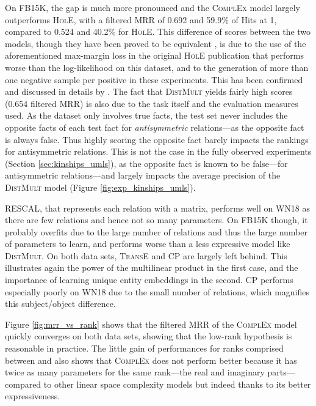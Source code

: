 \documentclass[twoside,11pt]{article}
\renewcommand{\cite}{\citep}
\begin{document}
On FB15K, the gap is much more pronounced and the \textsc{ComplEx} model largely outperforms \textsc{HolE}, with a filtered MRR of 0.692 and 59.9\% of Hits at 1, compared to 0.524 and 40.2\% for \textsc{HolE}.
This difference of scores between the two models, though they have been proved
to be equivalent \cite{hayashi2017equivalence}, is due to the use of the aforementioned
max-margin loss in the original \textsc{HolE} publication \cite{nickel_2016_holographic}
that performs worse than the log-likelihood on this dataset,
and to the generation of more than one negative
sample per positive in these experiments. This has been confirmed
and discussed in details by \citet{trouillon2017comparison}. 
The fact that \textsc{DistMult} yields fairly high scores (0.654 filtered MRR)
is also due to the task itself and the evaluation measures used. 
As the dataset only involves true facts, 
the test set never includes the opposite facts  of each
test fact  for \emph{antisymmetric} relations---as the opposite fact is always false. 
Thus highly scoring the opposite fact barely impacts the
rankings for antisymmetric relations. This is not the case in the fully observed 
experiments (Section \ref{sec:kinships_umls}), as the opposite fact is known to be false---for antisymmetric relations---and largely impacts the average precision of the \textsc{DistMult} model (Figure \ref{fig:exp_kinships_umls}).

RESCAL, that represents each relation with a  matrix, performs well on WN18
as there are few relations and hence not so many parameters. On FB15K though,
it probably overfits due to the large number of relations and thus
the large number of parameters to learn, and performs worse than a 
less expressive model like \textsc{DistMult}.
On both data sets, \textsc{TransE} and CP are largely left behind. This illustrates again the power of the multilinear product in the first case, and the importance of learning unique entity embeddings in the second. CP performs especially poorly on WN18 due to the small number of \mbox{relations}, which magnifies this subject/object difference. 

Figure \ref{fig:mrr_vs_rank} shows that the filtered MRR of the \textsc{ComplEx} model quickly 
converges on both data sets, showing that the low-rank hypothesis is reasonable in practice. 
The little gain of performances for ranks comprised between  and  also shows that 
\textsc{ComplEx} does not perform better because it has twice as many parameters for the 
same rank---the real and imaginary parts---compared to other linear space complexity models 
but indeed thanks to its better expressiveness.
\end{document}
